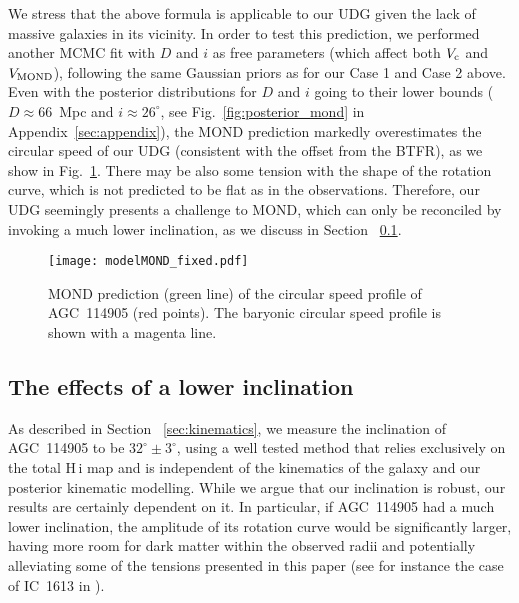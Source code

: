 \documentclass[fleqn,usenatbib]{mnras}
\begin{document}
We stress that the above formula is applicable to our UDG given the lack of massive galaxies in its vicinity. In order to test this prediction, we performed another MCMC fit with $D$ and $i$ as free parameters (which affect both $V_{\rm c}$ and $V_{\rm MOND}$), following the same Gaussian priors as for our Case 1 and Case 2 above. Even with the posterior distributions for $D$ and $i$ going to their lower bounds ($D \approx 66$~Mpc and $i \approx 26^\circ$, see Fig.~\ref{fig:posterior_mond} in Appendix~\ref{sec:appendix}), the MOND prediction markedly overestimates the circular speed of our UDG (consistent with the offset from the BTFR), as we show in Fig.~\ref{fig:MOND}. There may be also some tension with the shape of the rotation curve, which is not predicted to be flat as in the observations. Therefore, our UDG seemingly presents a challenge to MOND, which can only be reconciled by invoking a much lower inclination, as we discuss in Section~ \ref{sec:low_inc}. %

\begin{figure}
    \centering
    \texttt{[image: modelMOND\_fixed.pdf]}
    \caption{MOND prediction (green line) of the circular speed profile of AGC~114905 (red points). The baryonic circular speed profile is shown with a magenta line.}
    \label{fig:MOND}
\end{figure}


\subsection{The effects of a lower inclination}
\label{sec:low_inc}
As described in Section~ \ref{sec:kinematics}, we measure the inclination of AGC~114905 to be $32^\circ \pm 3^\circ$, using a well tested method that relies exclusively on the total H\,{\sc i} map and is independent of the kinematics of the galaxy and our posterior kinematic modelling. While we argue that our inclination is robust, our results are certainly dependent on it. In particular, if AGC~114905 had a much lower inclination, the amplitude of its rotation curve would be significantly larger, having more room for dark matter within the observed radii and potentially alleviating some of the tensions presented in this paper (see for instance the case of IC~1613 in \citealt{oman_missingdarkmatter}).
\end{document}
